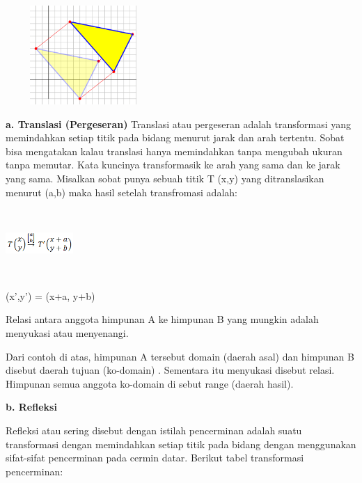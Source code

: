 \documentclass[11pt,fleqn]{book} %
\begin{document}
\noindent 
\begin{center}
	\noindent \includegraphics*[width=2.32in, height=1.48in, keepaspectratio=false, trim=0.00in 0.11in 0.00in 0.00in]{Pictures/2.PNG}
\end{center}
\noindent 
\noindent \textbf{a. Translasi (Pergeseran)}
\noindent 
Translasi atau pergeseran adalah transformasi yang memindahkan setiap titik pada bidang menurut jarak dan arah tertentu. Sobat bisa mengatakan kalau translasi hanya memindahkan tanpa mengubah ukuran tanpa memutar. Kata kuncinya transformasik ke arah yang sama dan ke jarak yang sama. Misalkan sobat punya sebuah titik T (x,y)  yang ditranslasikan menurut (a,b) maka hasil setelah transfromasi  adalah:

\noindent 
\begin{center}
	\noindent \includegraphics*[width=1.01in, height=1.01in, keepaspectratio=false, trim=0.00in 0.11in 0.00in 0.00in]{Pictures/3.PNG}
\end{center}
\noindent (x’,y’) = (x+a, y+b)
\noindent 

\noindent Relasi antara anggota himpunan A ke himpunan B yang mungkin adalah menyukasi atau menyenangi.

\noindent Dari contoh di atas, himpunan A tersebut domain (daerah asal) dan himpunan B disebut daerah tujuan (ko-domain) . Sementara itu menyukasi disebut relasi. Himpunan semua anggota ko-domain di sebut range (daerah hasil).

\noindent 

\noindent \textbf{b. Refleksi}

\noindent 

Refleksi atau sering disebut dengan istilah pencerminan adalah suatu transformasi dengan memindahkan setiap titik pada bidang dengan menggunakan sifat-sifat pencerminan pada cermin datar. Berikut tabel transformasi pencerminan:
\end{document}
